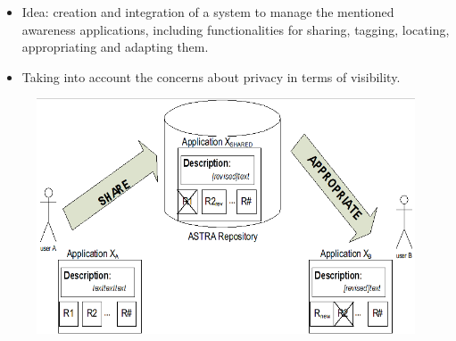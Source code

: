 \begin{frame}

\begin{itemize}
  \item Idea: creation and integration of a system to manage the mentioned awareness
applications, including functionalities for sharing, tagging, locating,
appropriating and adapting them.
	\item Taking into account the concerns about privacy in terms of visibility.
\end{itemize}


\begin{figure}
 	\includegraphics[scale=0.25]{img/repository-appropiation.png}
\end{figure}


\end{frame}

